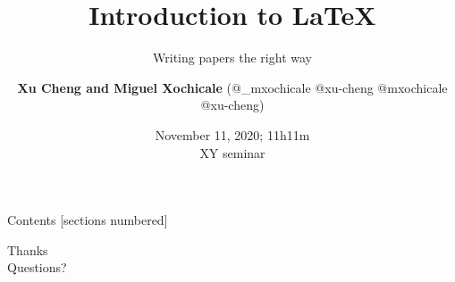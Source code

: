 \documentclass[xcolor={dvipsnames},aspectratio=169,10pt]{beamer}
\title{Introduction to \LaTeX}
\subtitle{Writing papers the right way}
\author{
{\bf Xu Cheng and  Miguel Xochicale}
(\faTwitter @\_mxochicale @xu-cheng
\faGithub @mxochicale @xu-cheng)
}
\date{November 11, 2020; 11h11m\\
	XY seminar}
\begin{document}
\maketitle

\begin{frame}{Contents}
  [sections numbered]
  \tableofcontents[hideallsubsections]
\end{frame}






\begin{frame}[standout]
  Thanks \\
  Questions?
\end{frame}
\end{document}
